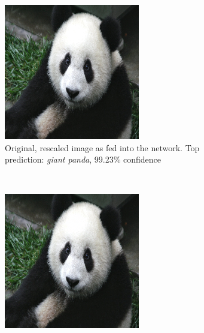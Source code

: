 \documentclass[11pt, a4paper]{article}
\begin{document}
\begin{figure}[htb]
    \centering
    \begin{subfigure}[b]{0.45\textwidth}
        \includegraphics[width=\textwidth]{aes_new/panda.png}
        \caption{Original, rescaled image as fed into the network. Top prediction: \emph{giant panda}, 99.23\% confidence}
        \label{fig:ae-example-original}
    \end{subfigure}
    ~ %
    \begin{subfigure}[b]{0.45\textwidth}
        \includegraphics[width=\textwidth]{aes_new/panda_acorn_10_0dot9.png}

\end{subfigure}
\end{figure}
\end{document}
